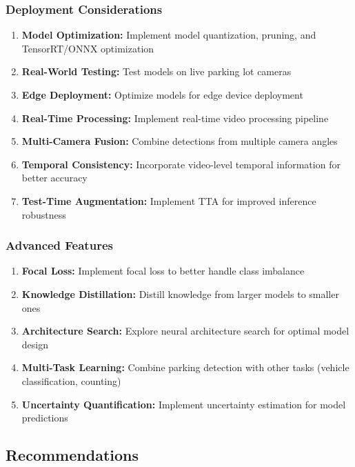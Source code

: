 \documentclass[12pt,a4paper]{article}
\begin{document}
\subsubsection{Deployment Considerations}

\begin{enumerate}
    \item \textbf{Model Optimization:} Implement model quantization, pruning, and TensorRT/ONNX optimization
    \item \textbf{Real-World Testing:} Test models on live parking lot cameras
    \item \textbf{Edge Deployment:} Optimize models for edge device deployment
    \item \textbf{Real-Time Processing:} Implement real-time video processing pipeline
    \item \textbf{Multi-Camera Fusion:} Combine detections from multiple camera angles
    \item \textbf{Temporal Consistency:} Incorporate video-level temporal information for better accuracy
    \item \textbf{Test-Time Augmentation:} Implement TTA for improved inference robustness
\end{enumerate}

\subsubsection{Advanced Features}

\begin{enumerate}
    \item \textbf{Focal Loss:} Implement focal loss to better handle class imbalance
    \item \textbf{Knowledge Distillation:} Distill knowledge from larger models to smaller ones
    \item \textbf{Architecture Search:} Explore neural architecture search for optimal model design
    \item \textbf{Multi-Task Learning:} Combine parking detection with other tasks (vehicle classification, counting)
    \item \textbf{Uncertainty Quantification:} Implement uncertainty estimation for model predictions
\end{enumerate}

\subsection{Recommendations}
\end{document}
